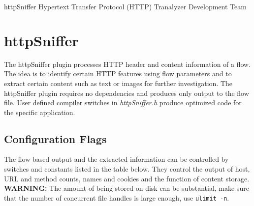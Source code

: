 \documentclass[documentation]{subfiles}
\begin{document}
\trantitle
    {httpSniffer}
    {Hypertext Transfer Protocol (HTTP)}
    {Tranalyzer Development Team}

\section{httpSniffer}\label{s:httpSniffer}
The httpSniffer plugin processes HTTP header and content information of a flow. The idea is to identify
certain HTTP features using flow parameters and to extract certain content such as text or
images for further investigation. The httpSniffer plugin requires no dependencies and produces
only output to the flow file. User defined compiler switches in {\em httpSniffer.h} produce
optimized code for the specific application.

\subsection{Configuration Flags}
The flow based output and the extracted information can be controlled by switches and constants listed in the table below.
They control the output of host, URL and method counts, names and cookies and the function of content storage.
{\bf WARNING:} The amount of being stored on disk can be substantial, make sure that the number of concurrent file handles
is large enough, use {\tt ulimit -n}.
\end{document}
